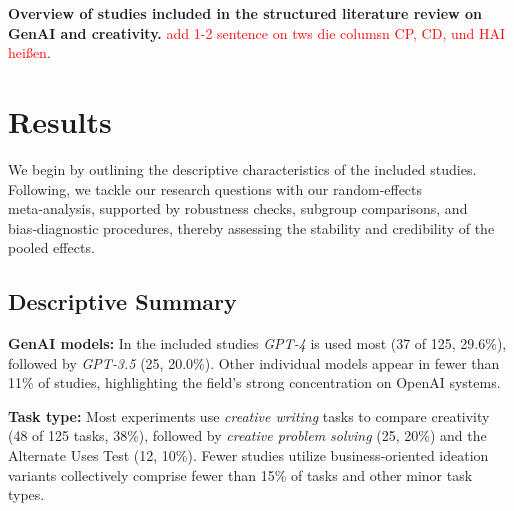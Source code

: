 \documentclass[manuscript, screen, review, acmsmall, anonymous]{acmart}
\newcommand{\TODO}[1]{\textcolor{red}{#1}}
\begin{document}
\newpage

\begin{landscape}

\begin{table}[H]
  \centering
    \tiny
    \fontsize{5}{5.8}\selectfont
    \setlength{\tabcolsep}{1pt}
    \renewcommand{\arraystretch}{1.0}
    
  \caption{\textbf{Overview of studies included in the structured literature review on GenAI and creativity.} \TODO{add 1-2 sentence on tws die columsn CP, CD, und HAI heißen}.}
  \label{tab:meta_analysis_literature}
\end{table}

\end{landscape}

\newpage

\section{Results}
\label{sec:results}
We begin by outlining the descriptive characteristics of the included studies. Following, we tackle our research questions with our random‑effects meta‑analysis, supported by robustness checks, subgroup comparisons, and bias‑diagnostic procedures, thereby assessing the stability and credibility of the pooled effects.
\subsection{Descriptive Summary}
\label{sec:descriptive_summary}

\textbf{GenAI models:} In the included studies \emph{GPT‑4} is used most (37 of 125, 29.6\%), followed by \emph{GPT‑3.5} (25, 20.0\%). Other individual models appear in fewer than 11\% of studies, highlighting the field’s strong concentration on OpenAI systems.

\textbf{Task type:} Most experiments use \emph{creative writing} tasks to compare creativity (48 of 125 tasks, 38\%), followed by \emph{creative problem solving} (25, 20\%) and the Alternate Uses Test (12, 10\%). Fewer studies utilize business‑oriented ideation variants collectively comprise fewer than 15\% of tasks and other minor task types.
\end{document}
